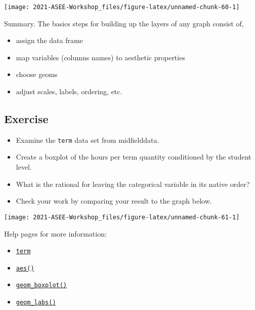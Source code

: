 \documentclass[
]{book}
\providecommand{\tightlist}{%
  \setlength{\itemsep}{0pt}\setlength{\parskip}{0pt}}
\begin{document}
\texttt{[image: 2021-ASEE-Workshop\_files/figure-latex/unnamed-chunk-60-1]}

Summary. The basics steps for building up the layers of any graph consist of,

\begin{itemize}
\tightlist
\item
  assign the data frame
\item
  map variables (columns names) to aesthetic properties\\
\item
  choose geoms\\
\item
  adjust scales, labels, ordering, etc.
\end{itemize}

\hypertarget{exercise-1}{%
\subsection{Exercise}\label{exercise-1}}

\begin{itemize}
\tightlist
\item
  Examine the \texttt{term} data set from midfielddata.
\item
  Create a boxplot of the hours per term quantity conditioned by the student level.
\item
  What is the rational for leaving the categorical variable in its native order?
\item
  Check your work by comparing your result to the graph below.
\end{itemize}

\texttt{[image: 2021-ASEE-Workshop\_files/figure-latex/unnamed-chunk-61-1]}

Help pages for more information:

\begin{itemize}
\tightlist
\item
  \href{https://midfieldr.github.io/midfielddata/reference/term.html}{\texttt{term}}
\item
  \href{https://ggplot2.tidyverse.org/reference/aes.html}{\texttt{aes()}}~\\
\item
  \href{https://ggplot2.tidyverse.org/reference/geom_boxplot.html}{\texttt{geom\_boxplot()}}
\item
  \href{https://ggplot2.tidyverse.org/reference/labs.html}{\texttt{geom\_labs()}}
\end{itemize}
\end{document}
